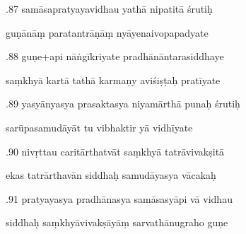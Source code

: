 \documentclass[article,12pt,a4paper]{memoir}%
\newcounter{parCount}
\begin{document}
	  
	  \pstart {}.87 samāsapratyayavidhau yathā nipatitā śrutiḥ 
	{}
	\pend%
      

	  
	  \pstart \leavevmode%
	guṇānāṃ paratantrāṇāṃ nyāyenaivopapadyate 
	{}
	\pend%
      

	  
	  \pstart {}.88 guṇe+api nāṅgīkriyate pradhānāntarasiddhaye 
	{}
	\pend%
      

	  
	  \pstart \leavevmode%
	saṃkhyā kartā tathā karmaṇy aviśiṣṭaḥ pratīyate 
	{}
	\pend%
      

	  
	  \pstart {}.89 yasyānyasya prasaktasya niyamārthā punaḥ śrutiḥ 
	{}
	\pend%
      

	  
	  \pstart \leavevmode%
	sarūpasamudāyāt tu vibhaktir yā vidhīyate 
	{}
	\pend%
      

	  
	  \pstart {}.90 nivṛttau caritārthatvāt saṃkhyā tatrāvivakṣitā 
	{}
	\pend%
      

	  
	  \pstart \leavevmode%
	ekas tatrārthavān siddhaḥ samudāyasya vācakaḥ 
	{}
	\pend%
      

	  
	  \pstart {}.91 pratyayasya pradhānasya samāsasyāpi vā vidhau 
	{}
	\pend%
      

	  
	  \pstart \leavevmode%
	siddhaḥ saṃkhyāvivakṣāyāṃ sarvathānugraho guṇe 
	{}
	\pend%
      
\end{document}
